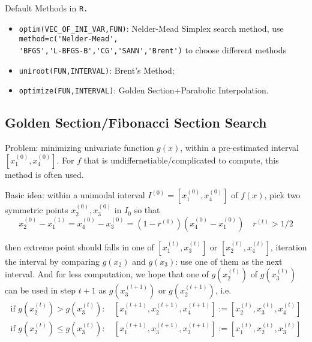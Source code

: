     
\begin{point}
    Default Methods in \lstinline|R.| 
\end{point}
\begin{itemize}[topsep=2pt,itemsep=0pt]
    \item \lstinline|optim(VEC_OF_INI_VAR,FUN)|: Nelder-Mead Simplex search method, use \lstinline|method=c('Nelder-Mead',|\\\lstinline|'BFGS','L-BFGS-B','CG','SANN','Brent')| to choose different methods
    \item \lstinline|uniroot(FUN,INTERVAL)|: Brent's Method;
    \item \lstinline|optimize(FUN,INTERVAL)|: Golden Section+Parabolic Interpolation.
\end{itemize}

    





\subsection{Golden Section/Fibonacci Section Search}
    \hypertarget{GoldenSection}{Problem}: minimizing univariate function $ g(x) $, within a pre-estimated interval $ [x_1^{(0)},x_4^{(0)}] $. For $ f $ that is undiffernetiable/complicated to compute, this method is often used. 

    Basic idea: within a unimodal interval $ I^{(0)}=[x_1^{(0)},x_4^{(0)}] $ of $ f(x) $, pick two symmetric points $ x_2^{(0)},x_3^{(0)} $ in $ I_0 $ so that 
\begin{equation}\label{EqaRExpressionInGolden}
    x_2^{(0)}-x_1^{(1)}=x_4^{(0)}-x_3^{(0)}=(1- r^{(0)})(x_4^{(0)}-x_1^{(0)}) \quad  r^{(t)}>1/2
\end{equation}
    
    then extreme point should falls in one of $ [x^{(t)}_1,x^{(t)}_3] $ or $ [x^{(t)}_2,x^{(t)}_4] $, iteration the interval by comparing $ g(x_2) $ and $ g(x_3) $: use one of them as the next interval. And for less computation, we hope that one of $ g(x_2^{(t)}) $ of $ g(x_3^{(t)}) $ can be used in step $ t+1 $ as $ g(x_3^{(t+1)}) $ or $ g(x_2^{(t+1)}) $, i.e.
    \begin{align}
        \text{if }g(x_2^{(t)})>g(x_3^{(t)}):&\, [x_1^{(t+1)},x_2^{(t+1)},x_4^{(t+1)}]:= [x_2^{(t)},x_3^{(t)},x_4^{(t)}]\\
        \text{if }g(x_2^{(t)})\leq g(x_3^{(t)}):&\, [x_1^{(t+1)},x_3^{(t+1)},x_3^{(t+1)}]:= [x_1^{(t)},x_2^{(t)},x_3^{(t)}]
        \end{align}


